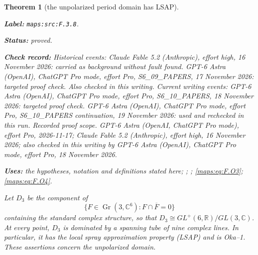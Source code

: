 \documentclass[11pt,a4paper]{article}
\newtheorem{theorem}{Theorem}[section]
\theoremstyle{definition}
\newcommand{\StatementRecord}[4]{\par\smallskip\begingroup\upshape\raggedright\noindent\textbf{Label:} \nolinkurl{#1}.\par\noindent\textbf{Status:} #2.\par\noindent\textbf{Check record:} #3.\par\noindent\textbf{Uses:} #4.\par\endgroup\smallskip}
\begin{document}
\begin{theorem}[the unpolarized period domain has LSAP]\label{maps:src:F.3.8}
\StatementRecord{maps:src:F.3.8}{proved}{Historical events: Claude Fable 5.2 (Anthropic), effort high, 16 November 2026: carried as background without fault found. GPT-6 Astra (OpenAI), ChatGPT Pro mode, effort Pro, S6\_09\_PAPERS, 17 November 2026: targeted proof check. Also checked in this writing. Current writing events: GPT-6 Astra (OpenAI), ChatGPT Pro mode, effort Pro, S6\_10\_PAPERS, 18 November 2026: targeted proof check. GPT-6 Astra (OpenAI), ChatGPT Pro mode, effort Pro, S6\_10\_PAPERS continuation, 19 November 2026: used and rechecked in this run. \emph{Recorded proof scope.} GPT-6 Astra (OpenAI, ChatGPT Pro mode), effort Pro, 2026-11-17; Claude Fable 5.2 (Anthropic), effort high, 16 November 2026; also checked in this writing by GPT-6 Astra (OpenAI), ChatGPT Pro mode, effort Pro, 18 November 2026}{the hypotheses, notation and definitions stated here; \cite[Definition 2.1, p.~4]{IVVOkaOneV5}; \cite[Proposition 7.13 and preceding paragraph, pp.~23--24]{IVVOkaOneV5}; \cref{maps:eq:F.O3}; \cref{maps:eq:F.O4}}


Let $D_3$ be the component of
\[
 \{F\in\operatorname{Gr}(3,\mathbb C^6):F\cap\overline F=0\}
\]
containing the standard complex structure, so that
$D_3\cong GL^+(6,\mathbb R)/GL(3,\mathbb C)$.
At every point, $D_3$
is dominated by a spanning tube of nine complex lines.  In particular,
it has the local spray approximation property (LSAP) and is Oka--1.
These assertions concern the unpolarized domain.

\end{theorem}
\end{document}
